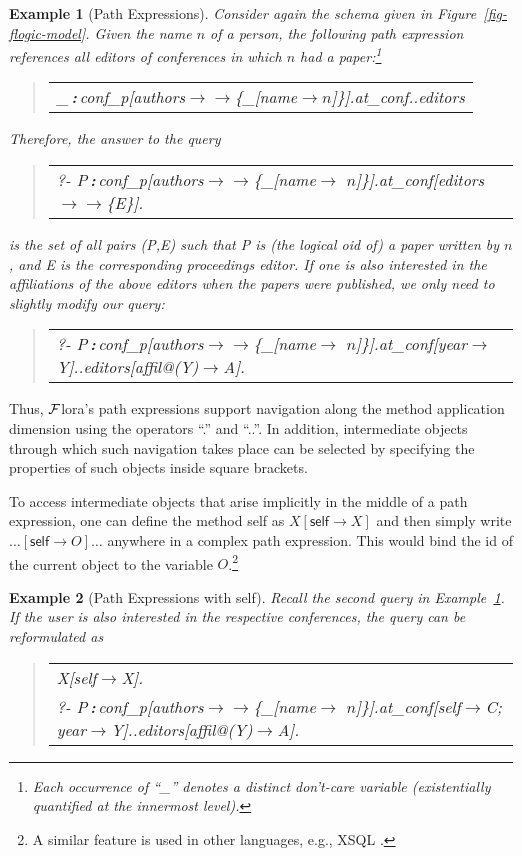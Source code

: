 \documentclass[11pt]{article}
\newtheorem{example}{Example}[section]
\newenvironment{qrules}{\begin{quote}\sf\begin{tabular}[t]{l}}%
{\end{tabular}\end{quote}}
\newcommand{\isa}{\,{\bf{:}}\,}
\newcommand{\fd}{\ensuremath{{\rightarrow}}}                   %
\newcommand{\mvd}{\ensuremath{{\rightarrow\!\!\!\!\rightarrow}}}  %
\newcommand{\anon}{\_}
\newcommand{\FLORA}{{\mbox{${\cal F}${\sc lora}}}\xspace}
\begin{document}
\begin{example}[Path Expressions]\label{Ex:PathExpr}
  \rm
  Consider again the schema given in Figure~\ref{fig-flogic-model}.
  Given the name $n$ of a person, the following path expression
  references all editors of conferences in which $n$ had a
  paper:\footnote{Each occurrence of ``\_'' denotes a distinct
    don't-care variable (existentially quantified at the
    innermost level).}
\begin{qrules}
  \anon\isa conf\_p[authors\mvd\{\anon [name\fd $n$]\}].at\_conf..editors
\end{qrules}
Therefore, the answer to the \emph{query}
\begin{qrules}
  ?- P\isa conf\_p[authors\mvd\{\anon [name\fd
  $n$]\}].at\_conf[editors\mvd\{E\}].
\end{qrules}
is the set of all pairs (\textsf{P},\textsf{E}) such that \textsf{P}
is (the logical oid of) a paper written by $n$, and \textsf{E} is the
corresponding proceedings editor.  If one is also interested in the
affiliations of the above editors when the papers were published, we only
need to slightly modify our query:
\begin{qrules}
  ?- P\isa conf\_p[authors\mvd\{\anon [name\fd
  $n$]\}].at\_conf[year\fd Y]..editors[affil@(Y)\fd A].
\end{qrules}
\end{example}
Thus, \FLORA's path expressions support navigation 
along the method application dimension using the operators
``.''  and
``..''. In addition, intermediate objects through which such navigation
takes place can be selected by specifying the properties of such objects
inside square brackets.

To access intermediate objects that arise implicitly in the middle
of a path expression, one can define the method \textsf{self} as
$X[\textsf{self}\fd X]$ and then simply
write $\dots[\textsf{self}\fd O]\dots$ anywhere in a complex
path expression. This would bind the id of the current object to the
variable $O$.\footnote{
  A similar feature is used in other
  languages, e.g., XSQL \cite{xsql-92}.
  }

\begin{example}[Path Expressions with \textsf{self}]\label{ex-path-self}
  \rm
  Recall the second query in Example~\ref{Ex:PathExpr}. If the user is
  also interested in the respective conferences, the query can be
  reformulated as
\begin{qrules}
  X[self\fd X].\\
   ?- P\isa conf\_p[authors\mvd\{\anon [name\fd
   $n$]\}].at\_conf[self\fd C; year\fd Y]..editors[affil@(Y)\fd A]. 
\end{qrules}
\end{example}
\end{document}
